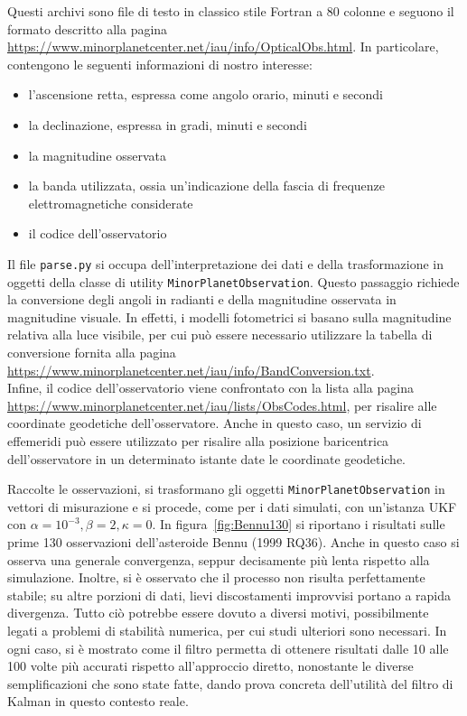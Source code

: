 \documentclass[12pt,a4paper,openright,twoside]{book}
\begin{document}
Questi archivi sono file di testo in classico stile Fortran a 80 colonne e seguono il formato descritto alla pagina \url{https://www.minorplanetcenter.net/iau/info/OpticalObs.html}. In particolare, contengono le seguenti informazioni di nostro interesse:
\begin{itemize}
\item l'ascensione retta, espressa come angolo orario, minuti e secondi
\item la declinazione, espressa in gradi, minuti e secondi
\item la magnitudine osservata
\item la banda utilizzata, ossia un'indicazione della fascia di frequenze elettromagnetiche considerate
\item il codice dell'osservatorio
\end{itemize}
Il file \lstinline{parse.py} si occupa dell'interpretazione dei dati e della trasformazione in oggetti della classe di utility \lstinline{MinorPlanetObservation}. Questo passaggio richiede la conversione degli angoli in radianti e della magnitudine osservata in magnitudine visuale. In effetti, i modelli fotometrici si basano sulla magnitudine relativa alla luce visibile, per cui può essere necessario utilizzare la tabella di conversione fornita alla pagina \url{https://www.minorplanetcenter.net/iau/info/BandConversion.txt}. \\
Infine, il codice dell'osservatorio viene confrontato con la lista alla pagina \url{https://www.minorplanetcenter.net/iau/lists/ObsCodes.html}, per risalire alle coordinate geodetiche dell'osservatore. Anche in questo caso, un servizio di effemeridi può essere utilizzato per risalire alla posizione baricentrica dell'osservatore in un determinato istante date le coordinate geodetiche.



Raccolte le osservazioni, si trasformano gli oggetti \lstinline{MinorPlanetObservation} in vettori di misurazione e si procede, come per i dati simulati, con un'istanza UKF con $\alpha=10^{-3},\beta=2,\kappa=0$. In figura~\ref{fig:Bennu130} si riportano i risultati sulle prime 130 osservazioni dell'asteroide Bennu (1999 RQ36). Anche in questo caso si osserva una generale convergenza, seppur decisamente più lenta rispetto alla simulazione. Inoltre, si è osservato che il processo non risulta perfettamente stabile; su altre porzioni di dati, lievi discostamenti improvvisi portano a rapida divergenza. Tutto ciò potrebbe essere dovuto a diversi motivi, possibilmente legati a problemi di stabilità numerica, per cui studi ulteriori sono necessari. In ogni caso, si è mostrato come il filtro permetta di ottenere risultati dalle 10 alle 100 volte più accurati rispetto all'approccio diretto, nonostante le diverse semplificazioni che sono state fatte, dando prova concreta dell'utilità del filtro di Kalman in questo contesto reale.
\end{document}
